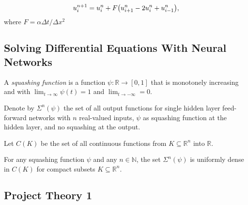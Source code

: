 \begin{equation}\label{eq:FE scheme}
    u_i^{n+1} = u_i^n + F \qty(u_{i+1}^n - 2u_i^n + u_{i-1}^n),
\end{equation}
where $F=\alpha \Delta t/\Delta x^2$

\subsection{Solving Differential Equations With Neural Networks}

\begin{definition}
A \emph{squashing function} is a function $\psi\colon\mathbb{R}\to[0,1]$ that is monotonely increasing and with $\lim_{t\to\infty}\psi(t)=1$ and $\lim_{t\to -\infty}=0$.
\end{definition}

Denote by $\Sigma^n(\psi)$ the set of all output functions for single hidden layer feed-forward networks with $n$ real-valued inputs, $\psi$ as squashing function at the hidden layer, and no squashing at the output.

Let $C(K)$ be the set of all continuous functions from $K\subseteq\mathbb{R}^n$ into $\mathbb{R}$.

\begin{theorem}
For any squashing function $\psi$ and any $n\in\mathbb{N}$, the set $\Sigma^n(\psi)$ is uniformly dense in $C(K)$ for compact subsets $K\subseteq\mathbb{R}^n$.
\end{theorem}

\subsection{Project Theory 1}\label{sec:project theory}


